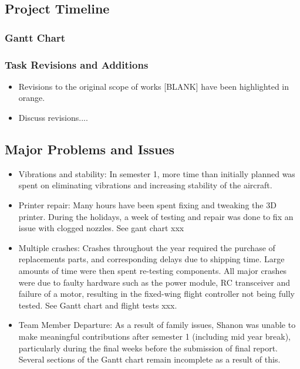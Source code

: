 \subsection{Project Timeline}
\subsubsection*{Gantt Chart}


\subsubsection*{Task Revisions and Additions}

\begin{itemize}
	\item Revisions to the original scope of works [BLANK] have been highlighted in orange.
	
	\item Discuss revisions....

\end{itemize}

\subsection{Major Problems and Issues}
\begin{itemize}
	\item Vibrations and stability: In semester 1, more time than initially planned was spent on eliminating vibrations and increasing stability of the aircraft. 
	
	\item Printer repair: Many hours have been spent fixing and tweaking the 3D printer.  During the holidays, a week of testing and repair was done to fix an issue with clogged nozzles. See gant chart xxx
	
	\item Multiple crashes: Crashes throughout the year required the purchase of replacements parts, and corresponding delays due to shipping time. Large amounts of time were then spent re-testing components. All major crashes were due to faulty hardware such as the power module, RC transceiver and failure of a motor, resulting in the fixed-wing flight controller not being fully tested. See Gantt chart and flight tests xxx.
	
	\item Team Member Departure: As a result of family issues, Shanon was unable to make meaningful contributions after semester 1 (including mid year break), particularly during the final weeks before the submission of final report. Several sections of the Gantt chart remain incomplete as a result of this.
\end{itemize}

